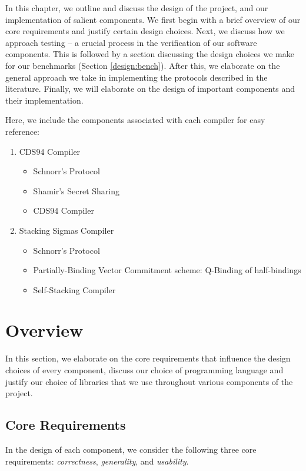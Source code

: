 In this chapter, we outline and discuss the design of the project, and our 
implementation of salient components. 
We first begin with a brief overview of our core requirements and justify certain design choices.  
Next, we discuss how we approach testing -- a crucial process in the 
verification of our software components. This is followed by a section discussing the design 
choices we make for our benchmarks (Section \ref{design:bench}). After this, 
we elaborate on the general approach we take in implementing the protocols described in 
the literature. Finally, we will elaborate on the design of important components 
and their implementation.

Here, we include the components associated with each compiler for easy reference:

\begin{enumerate}
  \item CDS94 Compiler
  \begin{itemize}
    \item Schnorr's Protocol     
    \item Shamir's Secret Sharing 
    \item CDS94 Compiler 
  \end{itemize}
  \item Stacking Sigmas Compiler
  \begin{itemize}
    \item Schnorr's Protocol 
    \item Partially-Binding Vector Commitment scheme: Q-Binding of half-bindings 
    \item Self-Stacking Compiler
  \end{itemize}
\end{enumerate}

\section{Overview}\label{design:overview}
In this section, we 
elaborate on the core requirements that influence the design choices of 
every component, discuss our choice of programming language and justify 
our choice of libraries 
that we use throughout various components of the project. 
\subsection{Core Requirements}
In the design of each component, we consider the following 
three core requirements: \emph{correctness}, \emph{generality}, and 
\emph{usability}. 

